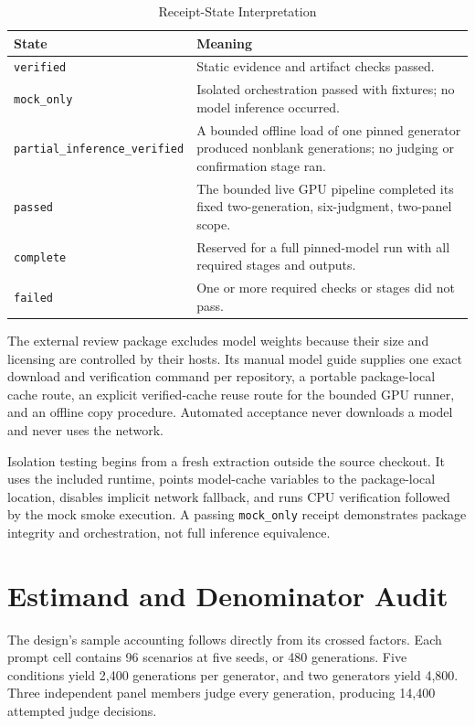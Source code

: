 \documentclass[conference]{IEEEtran}
\begin{document}
\begin{table}[!t]
\centering
\caption{Receipt-State Interpretation}
\label{tab:receipts}
\footnotesize
\begin{tabular}{@{}p{}p{}@{}}
\toprule
\textbf{State} & \textbf{Meaning} \\
\midrule
\texttt{verified} & Static evidence and artifact checks passed. \\
\texttt{mock\_only} & Isolated orchestration passed with fixtures; no model inference occurred. \\
\texttt{partial\_inference\_}\allowbreak\texttt{verified} & A bounded offline load of one pinned generator produced nonblank generations; no judging or confirmation stage ran. \\
\texttt{passed} & The bounded live GPU pipeline completed its fixed two-generation, six-judgment, two-panel scope. \\
\texttt{complete} & Reserved for a full pinned-model run with all required stages and outputs. \\
\texttt{failed} & One or more required checks or stages did not pass. \\
\bottomrule
\end{tabular}
\end{table}

The external review package excludes model weights because their size and licensing are controlled by their hosts. Its manual model guide supplies one exact download and verification command per repository, a portable package-local cache route, an explicit verified-cache reuse route for the bounded GPU runner, and an offline copy procedure. Automated acceptance never downloads a model and never uses the network.

Isolation testing begins from a fresh extraction outside the source checkout. It uses the included runtime, points model-cache variables to the package-local location, disables implicit network fallback, and runs CPU verification followed by the mock smoke execution. A passing \texttt{mock\_only} receipt demonstrates package integrity and orchestration, not full inference equivalence.

\section{Estimand and Denominator Audit}
\label{app:denominators}

The design's sample accounting follows directly from its crossed factors. Each prompt cell contains 96 scenarios at five seeds, or 480 generations. Five conditions yield 2,400 generations per generator, and two generators yield 4,800. Three independent panel members judge every generation, producing 14,400 attempted judge decisions.
\end{document}
